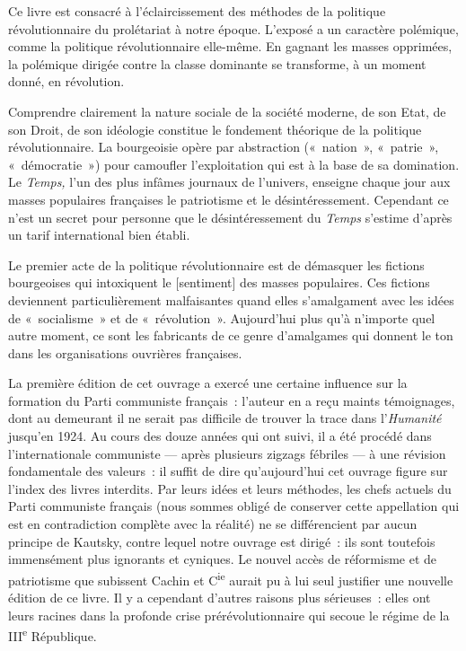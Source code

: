 \documentclass[french,twoside]{book} %
\newcommand\corr[1]{#1}
\begin{document}
\noindent Ce livre est consacré à l’éclaircissement des méthodes de la politique révolutionnaire du prolétariat à notre époque. L’exposé a un caractère polémique, comme la politique révolutionnaire elle-même. En gagnant les masses opprimées, la polémique dirigée contre la classe dominante se transforme, à un moment donné, en révolution.\par
Comprendre clairement la nature sociale de la société moderne, de son Etat, de son Droit, de son idéologie constitue le fondement théorique de la politique révolutionnaire. La bourgeoisie opère par abstraction (« nation », « patrie », « démocratie ») pour camoufler l’exploitation qui est à la base de sa domination. Le \emph{Temps,} l’un des plus infâmes journaux de l’univers, enseigne chaque jour aux masses populaires françaises le patriotisme et le désintéressement. Cependant ce n’est un secret pour personne que le désintéressement du \emph{Temps} s’estime d’après un tarif international bien établi.\par
Le premier acte de la politique révolutionnaire est de démasquer les fictions bourgeoises qui intoxiquent le [{\corr sentiment}] des masses populaires. Ces fictions deviennent  particulièrement malfaisantes quand elles s’amalgament avec les idées de « socialisme » et de « révolution ». Aujourd’hui plus qu’à n’importe quel autre moment, ce sont les fabricants de ce genre d’amalgames qui donnent le ton dans les organisations ouvrières françaises.\par
La première édition de cet ouvrage a exercé une certaine influence sur la formation du Parti communiste français : l’auteur en a reçu maints témoignages, dont au demeurant il ne serait pas difficile de trouver la trace dans l’\emph{Humanité} jusqu’en 1924. Au cours des douze années qui ont suivi, il a été procédé dans l’internationale communiste — après plusieurs zigzags fébriles — à une révision fondamentale des valeurs : il suffit de dire qu’aujourd’hui cet ouvrage figure sur l’index des livres interdits. Par leurs idées et leurs méthodes, les chefs actuels du Parti communiste français (nous sommes obligé de conserver cette appellation qui est en contradiction complète avec la réalité) ne se différencient par aucun principe de Kautsky, contre lequel notre ouvrage est dirigé : ils sont toutefois immensément plus ignorants et cyniques. Le nouvel accès de réformisme et de patriotisme que subissent Cachin et C\textsuperscript{ie} aurait pu à lui seul justifier une nouvelle édition de ce livre. Il y a cependant d’autres raisons plus sérieuses : elles ont leurs racines dans la profonde crise prérévolutionnaire qui secoue le régime de la III\textsuperscript{e} République.\par
\end{document}
